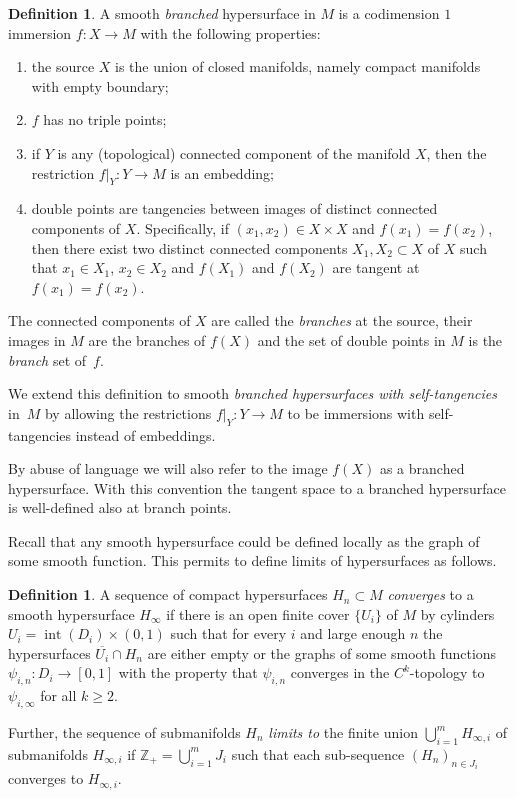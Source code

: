 \documentclass[10pt]{amsart}
\DeclareMathOperator{\inte}{int}
\theoremstyle{definition}
\newtheorem{definition}[theorem]{Definition}
\theoremstyle{remark}
\numberwithin{equation}{section}
\newcommand{\ZZ}{\mathbb Z}
\begin{document}
\begin{definition}
A smooth \emph{branched} hypersurface in $M$ is a codimension $1$ immersion
$f: X\to M$ with the following properties:
\begin{enumerate}
\item the source $X$ is the union of closed manifolds, namely compact manifolds with empty boundary;
\item $f$ has no triple points;
\item if $Y$ is any (topological) connected component of the manifold $X$, then the
restriction $f|_{Y}: Y\to M$ is an embedding;
\item double points are tangencies between images of distinct connected components of $X$.
Specifically, if
$(x_1,x_2)\in X\times X$ and $f(x_1)=f(x_2)$, then there exist two distinct connected components $X_1, X_2\subset X$
of $X$ such that $x_1\in X_1$, $x_2\in X_2$ and $f(X_1)$ and $f(X_2)$ are tangent at $f(x_1)=f(x_2)$.
\end{enumerate}
The connected components of $X$ are called the \emph{branches} at the source, their images in $M$ are the
branches of $f(X)$ and the set of double points in $M$ is the \emph{branch} set of~$f$.

We extend this definition to smooth \emph{branched hypersurfaces with self-tangencies} in~$M$
by allowing the restrictions $f|_{Y}: Y\to M$ to be immersions with self-tangencies instead of
embeddings.
\end{definition}

By abuse of language we will also refer to the image $f(X)$ as a branched hypersurface. With this convention
the tangent space to a branched hypersurface is well-defined also at branch points.

Recall that any smooth hypersurface could be defined locally as the graph of some smooth function.
This permits to define limits of hypersurfaces as follows.

\begin{definition}
A sequence of compact hypersurfaces $H_n\subset M$ \emph{converges} to a smooth hypersurface $H_{\infty}$ if there is an open finite cover $\{U_i\}$ of $M$ by cylinders
$U_i=\inte (D_i)\times (0,1)$ such that for every $i$ and large enough $n$ the hypersurfaces $\overline{U_i}\cap H_n$
are either empty or the graphs of some
smooth functions $\psi_{i,n}:D_i\to [0,1]$ with the property that $\psi_{i,n}$ converges in the $C^k$-topology to $\psi_{i,\infty}$
for all $k\geq 2$.

Further, the sequence of submanifolds $H_n$ \emph{limits to} the finite union $\bigcup_{i=1}^m H_{\infty,i}$ of submanifolds
$H_{\infty, i}$ if $\ZZ_+=\bigcup_{i=1}^mJ_i$ such that each
sub-sequence $(H_{n})_{n\in J_i}$ converges to $H_{\infty,i}$.
\end{definition}
\end{document}
